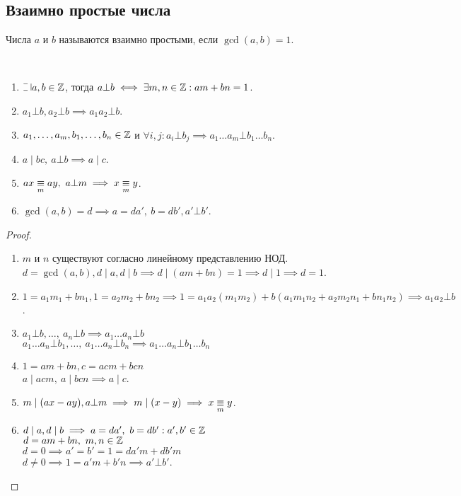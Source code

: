 \begin{normalsize}

\section{Взаимно простые числа}

\begin{defn}
    Числа $a$ и $b$ называются взаимно простыми, если $\gcd(a, b) = 1$.
\end{defn}

\begin{theorem-non}~
    \begin{enumerate}
        \item $\letus a, b \in \mathZ$, тогда $a \bot b \iff \exists m, n \in \mathbb{Z}: am + bn = 1$.
        \item $a_1 \bot b, a_2 \bot b \implies a_1a_2 \bot b$.
        \item $a_1, \ldots, a_m, b_1, \ldots, b_n \in \mathbb{Z}$ и $\forall i, j: a_i \bot b_j \implies a_1 \ldots a_m \bot b_1 \ldots b_n$.
        \item $a \mid bc,~a \bot b \implies a \mid c$.
        \item $ax \underset{m}{\equiv} ay,~a \bot m \implies x \underset{m}{\equiv} y$.
        \item $\gcd(a, b) = d \implies a = da',~b = db', a' \bot b'$.
    \end{enumerate}
\end{theorem-non}

\begin{proof}
    \begin{enumerate}
        \item $m$ и $n$ существуют согласно линейному представлению НОД.\\
        $d = \gcd(a, b), d \mid a, d \mid b \implies d \mid (am + bn) = 1 \implies d \mid 1 \implies d = 1$.
        \item $1 = a_1m_1 + bn_1, 1 = a_2m_2 + bn_2 \implies 1 = a_1a_2(m_1m_2) + b(a_1m_1n_2 + a_2m_2n_1+bn_1n_2) \implies a_1a_2 \bot b$.
        \item $a_1 \bot b, \ldots,~a_n \bot b \implies a_1 \ldots a_n \bot b$\\
        $a_1 \ldots a_n \bot b_1, \ldots,~a_1 \ldots a_n \bot b_n \implies a_1 \ldots a_n \bot b_1 \ldots b_n$
        \item $1 = am + bn, c = acm + bcn$\\
        $a \mid acm,~a \mid bcn \implies a \mid c$.
        \item $m \mid (ax - ay), a \bot m \implies m \mid (x - y) \implies x \underset{m}{\equiv} y$.
        \item $d \mid a, d \mid b \implies a = da',~b=db': a', b' \in \mathbb{Z}$\\
        $d = am + bn,~m, n \in \mathbb{Z}$\\
        $d = 0 \implies a' = b' = 1 = da'm + db'm$\\
        $d \neq 0 \implies 1 = a'm + b'n \implies a' \bot b'$.
    \end{enumerate}
\end{proof}

\end{normalsize}